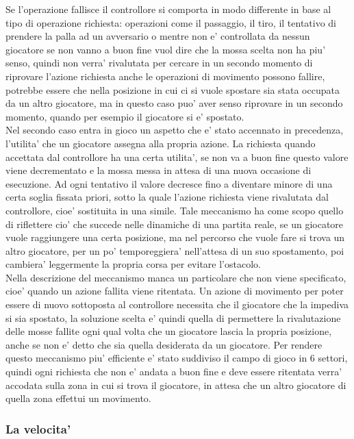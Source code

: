 Se l'operazione fallisce il controllore si comporta in modo differente in base al tipo di operazione richiesta: operazioni come il passaggio, il tiro, il tentativo di prendere la palla ad un avversario o mentre non e' controllata da nessun giocatore se non vanno a buon fine vuol dire che la mossa scelta non ha piu' senso, quindi non verra' rivalutata per cercare in un secondo momento di riprovare l'azione richiesta anche le operazioni di movimento possono fallire, potrebbe essere che nella posizione in cui ci si vuole spostare sia stata occupata da un altro giocatore, ma in questo caso puo' aver senso riprovare in un secondo momento, quando per esempio il giocatore si e' spostato.\\

Nel secondo caso entra in gioco un aspetto che e' stato accennato in precedenza, l'utilita' che un giocatore assegna alla propria azione. La richiesta quando accettata dal controllore ha una certa utilita', se non va a buon fine questo valore viene decrementato e la mossa messa in attesa di una nuova occasione di esecuzione. Ad ogni tentativo il valore decresce fino a diventare minore di una certa soglia fissata priori, sotto la quale l'azione richiesta viene rivalutata dal controllore, cioe' sostituita in una simile. Tale meccanismo ha come scopo quello di riflettere cio' che succede nelle dinamiche di una partita reale, se un giocatore vuole raggiungere una certa posizione, ma nel percorso che vuole fare si trova un altro giocatore, per un po' temporeggiera' nell'attesa di un suo spostamento, poi cambiera' leggermente la propria corsa per evitare l'ostacolo.\\

Nella descrizione del meccanismo manca un particolare che non viene specificato, cioe' quando un azione fallita viene ritentata. Un azione di movimento per poter essere di nuovo sottoposta al controllore necessita che il giocatore che la impediva si sia spostato, la soluzione scelta e' quindi quella di permettere la rivalutazione delle mosse fallite ogni qual volta che un giocatore lascia la propria posizione, anche se non e' detto che sia quella desiderata da un giocatore. Per rendere questo meccanismo piu' efficiente e' stato suddiviso il campo di gioco in 6 settori, quindi ogni richiesta che non e' andata a buon fine e deve essere ritentata verra' accodata sulla zona in cui si trova il giocatore, in attesa che un altro giocatore di quella zona effettui un movimento.

\subsubsection{La velocita'}
\label{sec:analisi_concorrenza_velocita}

